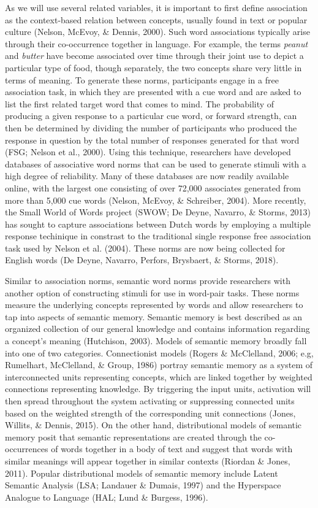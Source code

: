 \documentclass[english,man]{apa6}
\theoremstyle{definition}
\theoremstyle{definition}
\theoremstyle{definition}
\theoremstyle{remark}
\begin{document}
As we will use several related variables, it is important to first
define association as the context-based relation between concepts,
usually found in text or popular culture (Nelson, McEvoy, \& Dennis,
2000). Such word associations typically arise through their
co-occurrence together in language. For example, the terms \emph{peanut}
and \emph{butter} have become associated over time through their joint
use to depict a particular type of food, though separately, the two
concepts share very little in terms of meaning. To generate these norms,
participants engage in a free association task, in which they are
presented with a cue word and are asked to list the first related target
word that comes to mind. The probability of producing a given response
to a particular cue word, or forward strength, can then be determined by
dividing the number of participants who produced the response in
question by the total number of responses generated for that word (FSG;
Nelson et al., 2000). Using this technique, researchers have developed
databases of associative word norms that can be used to generate stimuli
with a high degree of reliability. Many of these databases are now
readily available online, with the largest one consisting of over 72,000
associates generated from more than 5,000 cue words (Nelson, McEvoy, \&
Schreiber, 2004). More recently, the Small World of Words project (SWOW;
De Deyne, Navarro, \& Storms, 2013) has sought to capture associations
between Dutch words by employing a multiple response techinique in
constrast to the traditional single response free association task used
by Nelson et al. (2004). These norms are now being collected for English
words (De Deyne, Navarro, Perfors, Brysbaert, \& Storms, 2018).

Similar to association norms, semantic word norms provide researchers
with another option of constructing stimuli for use in word-pair tasks.
These norms measure the underlying concepts represented by words and
allow researchers to tap into aspects of semantic memory. Semantic
memory is best described as an organized collection of our general
knowledge and contains information regarding a concept's meaning
(Hutchison, 2003). Models of semantic memory broadly fall into one of
two categories. Connectionist models (Rogers \& McClelland, 2006; e.g,
Rumelhart, McClelland, \& Group, 1986) portray semantic memory as a
system of interconnected units representing concepts, which are linked
together by weighted connections representing knowledge. By triggering
the input units, activation will then spread throughout the system
activating or suppressing connected units based on the weighted strength
of the corresponding unit connections (Jones, Willits, \& Dennis, 2015).
On the other hand, distributional models of semantic memory posit that
semantic representations are created through the co-occurrences of words
together in a body of text and suggest that words with similar meanings
will appear together in similar contexts (Riordan \& Jones, 2011).
Popular distributional models of semantic memory include Latent Semantic
Analysis (LSA; Landauer \& Dumais, 1997) and the Hyperspace Analogue to
Language (HAL; Lund \& Burgess, 1996).
\end{document}
